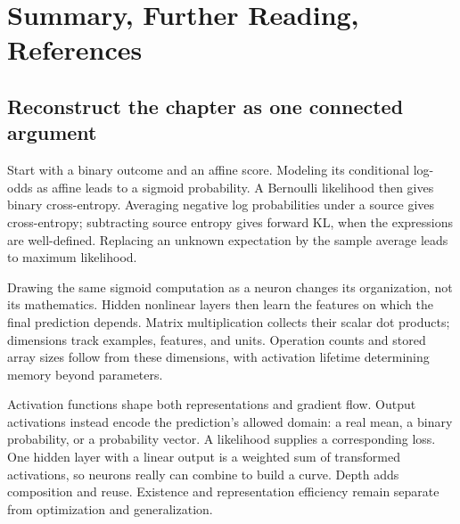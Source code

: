 \section{Summary, Further Reading, References}
\label{sec:logreg_to_mlp:summary_further_reading_references}

\subsection{Reconstruct the chapter as one connected argument}
Start with a binary outcome and an affine score. Modeling its conditional log-odds as affine leads to a sigmoid probability. A Bernoulli likelihood then gives binary cross-entropy. Averaging negative log probabilities under a source gives cross-entropy; subtracting source entropy gives forward KL, when the expressions are well-defined. Replacing an unknown expectation by the sample average leads to maximum likelihood.

Drawing the same sigmoid computation as a neuron changes its organization, not its mathematics. Hidden nonlinear layers then learn the features on which the final prediction depends. Matrix multiplication collects their scalar dot products; dimensions track examples, features, and units. Operation counts and stored array sizes follow from these dimensions, with activation lifetime determining memory beyond parameters.

Activation functions shape both representations and gradient flow. Output activations instead encode the prediction's allowed domain: a real mean, a binary probability, or a probability vector. A likelihood supplies a corresponding loss. One hidden layer with a linear output is a weighted sum of transformed activations, so neurons really can combine to build a curve. Depth adds composition and reuse. Existence and representation efficiency remain separate from optimization and generalization.

